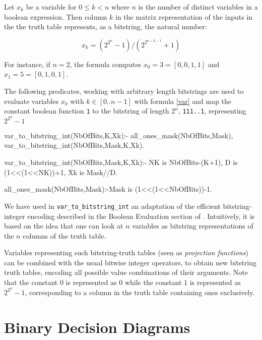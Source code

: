 \documentclass[]{INCLUDES/llncs}
\begin{document}
\begin{prop}
Let $x_k$ be a variable for $0 \leq k<n$
where $n$ is the number of distinct variables in a 
boolean expression. Then column $k$ in the matrix representation
of the inputs in the the truth table
represents, as a bitstring, the natural number:

\begin{equation} \label{var}
x_k={(2^{2^n}-1)}/{(2^{2^{n-k-1}}+1)} 
\end{equation}
\end{prop}

\noindent For instance, if $n=2$, the formula computes 
$x_0=3=[0,0,1,1]$ and $x_1=5=[0,1,0,1]$.

The following predicates, working with arbitrary length bitstrings are
used to evaluate 
variables $x_k$ with $k \in [0..n-1]$ with formula \ref{var} 
and map the
constant boolean function {\tt 1} 
to the bitstring of length $2^n$, {\tt 111..1},
representing ${2^{2^n}}-1$
\begin{code}
var_to_bitstring_int(NbOfBits,K,Xk):-
  all_ones_mask(NbOfBits,Mask),
  var_to_bitstring_int(NbOfBits,Mask,K,Xk).

var_to_bitstring_int(NbOfBits,Mask,K,Xk):-
  NK is NbOfBits-(K+1),
  D is (1<<(1<<NK))+1,
  Xk is Mask//D.
  
all_ones_mask(NbOfBits,Mask):-Mask is (1<<(1<<NbOfBits))-1.   
\end{code}

We have used in {\tt var\_to\_bitstring\_int} an adaptation of the efficient 
bitstring-integer encoding described in the Boolean Evaluation 
section of \cite{knuth06draft}. Intuitively, it is based on the idea that one
can look at $n$ variables as bitstring representations of the $n$ columns
of the truth table.

Variables representing such bitstring-truth tables 
(seen as {\em projection functions}) 
can be combined with the usual bitwise integer operators, 
to obtain new bitstring truth tables, 
encoding all possible value combinations of their arguments.
Note that the constant $0$ is represented as $0$ while the constant $1$
is represented as $2^{2^n}-1$, corresponding to a column in
the truth table containing ones exclusively.
 
\section{Binary Decision Diagrams} \label {bdds}
\end{document}
